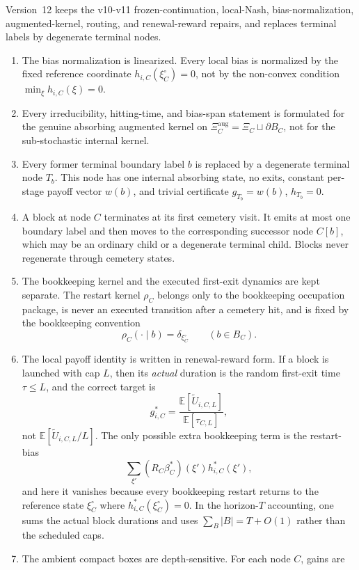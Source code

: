 \documentclass[12pt]{article}
\theoremstyle{definition}
\newcommand{\E}{\mathbb{E}}
\newcommand{\1}{\mathbf{1}}
\begin{document}
Version~12 keeps the v10-v11 frozen-continuation, local-Nash,
bias-normalization, augmented-kernel, routing, and renewal-reward repairs, and
replaces terminal labels by degenerate terminal nodes.

\begin{enumerate}[label=\textnormal{(\arabic*)},leftmargin=2.4em]
\item The bias normalization is linearized. Every local bias is normalized by the
fixed reference coordinate $h_{i,C}(\xi_C^\circ)=0$, not by the non-convex
condition $\min_\xi h_{i,C}(\xi)=0$.
\item Every irreducibility, hitting-time, and bias-span statement is formulated
for the genuine absorbing augmented kernel on
$\Xi_C^{\mathrm{aug}}=\Xi_C\sqcup\partial B_C$, not for the sub-stochastic
internal kernel.
\item Every former terminal boundary label $b$ is replaced by a degenerate
terminal node $T_b$. This node has one internal absorbing state, no exits,
constant per-stage payoff vector $w(b)$, and trivial certificate
$g_{T_b}=w(b)$, $h_{T_b}=0$.
\item A block at node $C$ terminates at its first cemetery visit. It emits at
most one boundary label and then moves to the corresponding successor node
$C[b]$, which may be an ordinary child or a degenerate terminal child. Blocks
never regenerate through cemetery states.
\item The bookkeeping kernel and the executed first-exit dynamics are kept
separate. The restart kernel $\rho_C$ belongs only to the bookkeeping occupation
package, is never an executed transition after a cemetery hit, and is fixed by
the bookkeeping convention
\[
\rho_C(\cdot\mid b)=\delta_{\xi_C^\circ}
\qquad (b\in B_C).
\]
\item The local payoff identity is written in renewal-reward form. If a block is
launched with cap $L$, then its \emph{actual} duration is the random first-exit
time $\tau\le L$, and the correct target is
\[
g_{i,C}^*
=
\frac{\E[\widetilde U_{i,C,L}]}{\E[\tau_{C,L}]},
\]
not $\E[\widetilde U_{i,C,L}/L]$. The only possible extra bookkeeping term is the
restart-bias
\[
\sum_{\xi'}(R_C\beta_C^*)(\xi')h_{i,C}^*(\xi'),
\]
and here it vanishes because every bookkeeping restart returns to the reference
state $\xi_C^\circ$ where $h_{i,C}^*(\xi_C^\circ)=0$. In the horizon-$T$
accounting, one sums the actual block durations and uses
$\sum_B |B| = T + O(1)$ rather than the scheduled caps.
\item The ambient compact boxes are depth-sensitive. For each node $C$, gains are

\end{enumerate}
\end{document}
